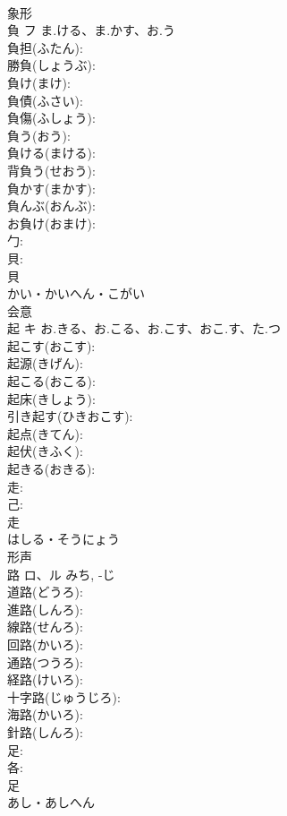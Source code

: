 \documentclass[8pt]{extreport}
\begin{document}
\begin{CJK}{UTF8}{min}
\\	象形 
\\	負	フ	ま.ける、ま.かす、お.う		
\\	負担(ふたん): 
\\	勝負(しょうぶ): 
\\	負け(まけ): 
\\	負債(ふさい): 
\\	負傷(ふしょう): 
\\	負う(おう): 
\\	負ける(まける): 
\\	背負う(せおう): 
\\	負かす(まかす): 
\\	負んぶ(おんぶ): 
\\	お負け(おまけ): 
\\	勹: 
\\	貝: 
\\	貝	
\\	かい・かいへん・こがい	
\\	会意 
\\	起	キ	お.きる、お.こる、お.こす、おこ.す、た.つ		
\\	起こす(おこす): 
\\	起源(きげん): 
\\	起こる(おこる): 
\\	起床(きしょう): 
\\	引き起す(ひきおこす): 
\\	起点(きてん): 
\\	起伏(きふく): 
\\	起きる(おきる): 
\\	走: 
\\	己: 
\\	走	
\\	はしる・そうにょう	
\\	形声 
\\	路	ロ、ル	みち, -じ		
\\	道路(どうろ): 
\\	進路(しんろ): 
\\	線路(せんろ): 
\\	回路(かいろ): 
\\	通路(つうろ): 
\\	経路(けいろ): 
\\	十字路(じゅうじろ): 
\\	海路(かいろ): 
\\	針路(しんろ): 
\\	足: 
\\	各: 
\\	足	
\\	あし・あしへん	

\end{CJK}
\end{document}
